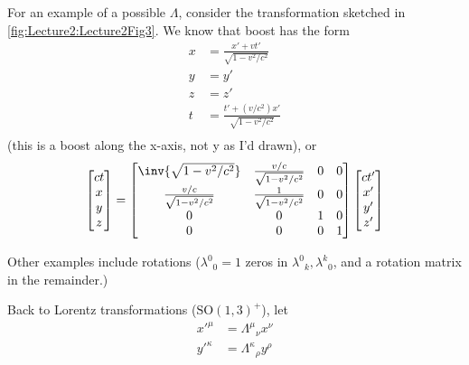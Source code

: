 For an example of a possible \( \Lambda \), consider the transformation sketched in
\cref{fig:Lecture2:Lecture2Fig3}.
We know that boost has the form
\begin{dmath}\label{eqn:qftLecture2:540}
\begin{aligned}
x &= \frac{x' + v t'}{\sqrt{1 - v^2/c^2}} \\
y &= y' \\
z &= z' \\
t &= \frac{t' + (v/c^2) x'}{\sqrt{1 - v^2/c^2}} \\
\end{aligned}
\end{dmath}
(this is a boost along the x-axis, not y as I'd drawn),
or
\begin{dmath}\label{eqn:qftLecture2:560}
\begin{bmatrix}
c t \\
x \\
y \\
z
\end{bmatrix}
=
\begin{bmatrix}
\inv{\sqrt{1 - v^2/c^2}} & \frac{v/c}{\sqrt{1 - v^2/c^2}} & 0 & 0 \\
\frac{v/c}{\sqrt{1 - v^2/c^2}} & \frac{1}{\sqrt{1 - v^2/c^2}} & 0 & 0 \\
0 & 0 & 1 & 0 \\
0 & 0 & 0 & 1 \\
\end{bmatrix}
\begin{bmatrix}
c t' \\
x' \\
y' \\
z'
\end{bmatrix}
\end{dmath}

Other examples include rotations (\({\lambda^0}_0 = 1\) zeros in \( {\lambda^0}_k, {\lambda^k}_0 \), and a rotation matrix in the remainder.)

Back to Lorentz transformations (\(\text{SO}(1,3)^+\)), let
\begin{dmath}\label{eqn:qftLecture2:600}
\begin{aligned}
{x'}^\mu    &= {\Lambda^\mu}_\nu x^\nu \\
{y'}^\kappa &= {\Lambda^\kappa}_\rho y^\rho
\end{aligned}
\end{dmath}

